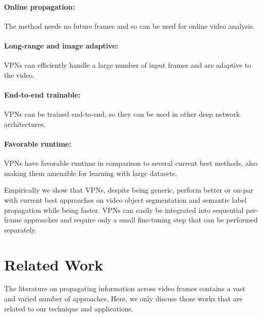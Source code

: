 \paragraph{Online propagation:} The method needs no future frames
and so can be used for online video analysis.
\vspace{-0.5cm}
\paragraph{Long-range and image adaptive:} VPNs can efficiently handle a large
number of input frames and are adaptive to the video.
\vspace{-0.5cm}
\paragraph{End-to-end trainable:} VPNs can be trained end-to-end, so they
can be used in other deep network architectures.
\vspace{-0.5cm}
\paragraph{Favorable runtime:} VPNs have favorable runtime in comparison to several current
best methods, also making them amenable for learning with
large datasets.

Empirically we show that VPNs, despite being generic,
perform better or on-par with current best approaches on video object segmentation
and semantic label propagation while being faster.
VPNs can easily be integrated into sequential per-frame approaches
and require only a small fine-tuning step that can be performed separately.

\section{Related Work}
\label{sec:related}

The literature on propagating information across video frames contains a vast and varied number of approaches.
Here, we only discuss those works that are related to our technique and applications.

\vspace{-0.3cm}
